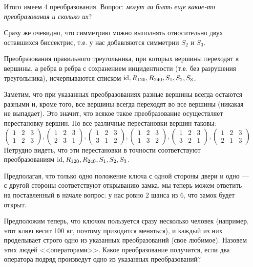 Итого имеем 4 преобразования. Вопрос: \textit{могут ли быть еще какие-то преобразования и сколько их}?

Сразу же очевидно, что симметрию можно выполнять относительно двух оставшихся биссектрис, т.е. у нас добавляются симметрии $S_2$ и $S_3$.

\begin{thrm}
Преобразования правильного треугольника, при которых вершины переходят в вершины, а ребра в ребра с сохранением инцидентности (т.е. без разрушения треугольника), исчерпываются списком $\mathrm{id}, R_{120}, R_{240}, S_1, S_2, S_3$.
\end{thrm}
\pf
Заметим, что при указанных преобразованиях разные вершины всегда остаются разными и, кроме того, все вершины всегда переходят во все вершины (никакая не выпадает). Это значит, что всякое такое преобразование осуществляет перестановку вершин. Но все различные перестановки вершин таковы:
$$
\begin{pmatrix}
1 & 2 & 3 \\
1 & 2 & 3
\end{pmatrix},
\begin{pmatrix}
1 & 2 & 3 \\
2 & 3 & 1
\end{pmatrix},
\begin{pmatrix}
1 & 2 & 3 \\
3 & 1 & 2
\end{pmatrix},
\begin{pmatrix}
1 & 2 & 3 \\
1 & 3 & 2
\end{pmatrix},
\begin{pmatrix}
1 & 2 & 3 \\
3 & 2 & 1
\end{pmatrix},
\begin{pmatrix}
1 & 2 & 3 \\
2 & 1 & 3
\end{pmatrix}
$$
Нетрудно видеть, что эти перестановки в точности соответствуют преобразованиям $\mathrm{id}, R_{120}, R_{240}, S_1, S_2, S_3$.
\epf

Предполагая, что только одно положение ключа с одной стороны двери и одно --- с другой стороны соответствуют открыванию замка, мы теперь можем ответить на поставленный в начале вопрос: у нас ровно 2 шанса из 6, что замок будет открыт.

Предположим теперь, что ключом пользуется сразу несколько человек (например, этот ключ весит 100 кг, поэтому приходится меняться), и каждый из них проделывает строго одно из указанных преобразований (свое любимое). Назовем этих людей <<операторами>>. Какое преобразование получится, если два оператора подряд произведут одно из указанных преобразований?

